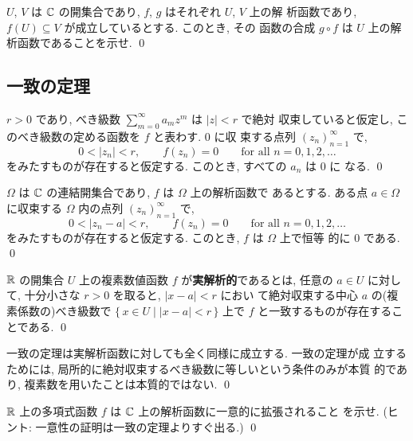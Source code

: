 \documentclass[12pt,twoside]{jarticle}
\begin{document}
\begin{question}
  $U$, $V$ は ${\mathbb C}$ の開集合であり, $f$, $g$ はそれぞれ $U$, $V$ 上の解
  析函数であり, $f(U)\subseteq V$ が成立しているとする. このとき, その
  函数の合成 $g\circ f$ は $U$ 上の解析函数であることを示せ. 
  \qed
\end{question}



\subsection{一致の定理}

\begin{question}
  $r>0$ であり, べき級数 $\sum_{m=0}^{\infty} a_m z^m$ は $|z|<r$ で絶対
  収束していると仮定し, このべき級数の定める函数を $f$ と表わす. $0$ に収
  束する点列 $(z_n)_{n=1}^{\infty}$ で, 
  \[
    0 < |z_n| < r,
    \qquad  f(z_n)=0
    \qquad \text{for all $n=0,1,2,\dots$}
  \]%
  をみたすものが存在すると仮定する. このとき, すべての $a_n$ は $0$ に
  なる. \qed
\end{question}

\begin{question}[一致の定理]
  $\Omega$ は ${\mathbb C}$ の連結開集合であり, $f$ は $\Omega$ 上の解析函数で
  あるとする. ある点 $a\in\Omega$ に収束する $\Omega$ 内の点列 
  $(z_n)_{n=1}^{\infty}$ で,
  \[
    0 < |z_n - a| < r,
    \qquad  f(z_n)=0
    \qquad \text{for all $n=0,1,2,\dots$}
  \]%
  をみたすものが存在すると仮定する. このとき, $f$ は $\Omega$ 上で恒等
  的に $0$ である. \qed
\end{question}

\begin{definition}[実解析函数]
${\mathbb R}$ の開集合 $U$ 上の複素数値函数 $f$ が{\bf 実解析的}であるとは, 
任意の $a\in U$ に対して, 十分小さな $r>0$ を取ると, $|x-a|<r$ におい
て絶対収束する中心 $a$ の(複素係数の)べき級数で %
$\{\,x\in U \mid |x-a|<r\,\}$ 上で $f$ と一致するものが存在することである. 
\qed
\end{definition}

\begin{rem}
一致の定理は実解析函数に対しても全く同様に成立する. 一致の定理が成
立するためには, 局所的に絶対収束するべき級数に等しいという条件のみが本質
的であり, 複素数を用いたことは本質的ではない.
\qed
\end{rem}

\begin{question}
  ${\mathbb R}$ 上の多項式函数 $f$ は ${\mathbb C}$ 上の解析函数に一意的に拡張されること
  を示せ. (ヒント: 一意性の証明は一致の定理よりすぐ出る.) \qed
\end{question}
\end{document}
